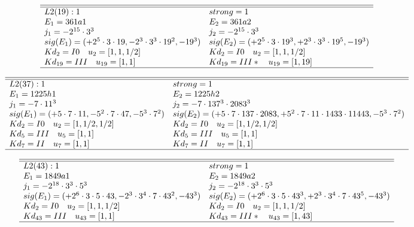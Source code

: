 \documentclass[11pt]{article}
\theoremstyle{definition}
\begin{document}
$$
 \begin{array}{ll}
 \hline 
\hline 
  L2(19):1  & strong=1\\
 E_1=361a1 & E_2=361a2 \\
 j_1=-2^{15}\cdot 3^{3} & j_2=-2^{15}\cdot 3^{3} \\
 sig(E_1)=(+2^{5}\cdot 3\cdot 19,-2^{3}\cdot 3^{3}\cdot 19^{2},-19^{3}) & sig(E_2)=(+2^{5}\cdot 3\cdot 19^{3},+2^{3}\cdot 3^{3}\cdot 19^{5},-19^{3}) \\
  Kd_{2}=I0\quad u_{2}=[ 1, 1, 1/2 ]&  Kd_{2}=I0\quad u_{2}=[ 1, 1, 1/2 ]\\
  Kd_{19}=III\quad u_{19}=[ 1, 1 ]&  Kd_{19}=III*\quad u_{19}=[ 1, 19 ]\\
\hline
\end{array}
 $$


$$
 \begin{array}{ll}
 \hline 
\hline 
  L2(37):1  & strong=1\\
 E_1=1225h1 & E_2=1225h2 \\
 j_1=-7\cdot 11^{3} & j_2=-7\cdot 137^{3}\cdot 2083^{3} \\
 sig(E_1)=(+5\cdot 7\cdot 11,-5^{2}\cdot 7\cdot 47,-5^{3}\cdot 7^{2}) & sig(E_2)=(+5\cdot 7\cdot 137\cdot 2083,+5^{2}\cdot 7\cdot 11\cdot 1433\cdot 
11443,-5^{3}\cdot 7^{2}) \\
  Kd_{2}=I0\quad u_{2}=[ 1, 1/2, 1/2 ]&  Kd_{2}=I0\quad u_{2}=[ 1, 1/2, 1/2 ]\\
  Kd_{5}=III\quad u_{5}=[ 1, 1 ]&  Kd_{5}=III\quad u_{5}=[ 1, 1 ]\\
  Kd_{7}=II\quad u_{7}=[ 1, 1 ]&  Kd_{7}=II\quad u_{7}=[ 1, 1 ]\\
\hline
\end{array}
 $$


$$
 \begin{array}{ll}
 \hline 
\hline 
  L2(43):1  & strong=1\\
 E_1=1849a1 & E_2=1849a2 \\
 j_1=-2^{18}\cdot 3^{3}\cdot 5^{3} & j_2=-2^{18}\cdot 3^{3}\cdot 5^{3} \\
 sig(E_1)=(+2^{6}\cdot 3\cdot 5\cdot 43,-2^{3}\cdot 3^{4}\cdot 7\cdot 
43^{2},-43^{3}) & sig(E_2)=(+2^{6}\cdot 3\cdot 5\cdot 43^{3},+2^{3}\cdot 3^{4}\cdot 7\cdot 
43^{5},-43^{3}) \\
  Kd_{2}=I0\quad u_{2}=[ 1, 1, 1/2 ]&  Kd_{2}=I0\quad u_{2}=[ 1, 1, 1/2 ]\\
  Kd_{43}=III\quad u_{43}=[ 1, 1 ]&  Kd_{43}=III*\quad u_{43}=[ 1, 43 ]\\
\hline
\end{array}
 $$
\end{document}
